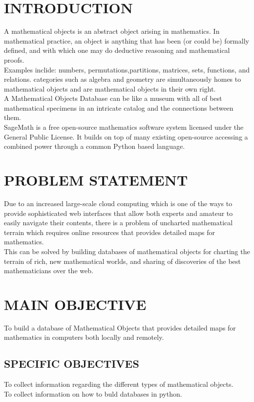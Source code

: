 \documentclass[11pt]{article} %
\begin{document}
\section{INTRODUCTION}
A mathematical objects is an abstract object arising in mathematics.
In mathematical practice, an object is anything that has been (or could be) formally defined, and with which one may do deductive reasoning and mathematical proofs.\\
Examples inclide: numbers, permutations,partitions, matrices, sets, functions, and relations.
categories such as algebra and geometry are simultaneously homes to mathematical objects and are mathematical objects in their own right.\\
A Mathematical Objects Database can be like a museum with all of best
mathematical specimens in an intricate catalog and the connections
between them.\\SageMath is a free open-source mathematics software
system licensed under the General Public License. It builds on top of
many existing open-source accessing a combined power through a common
Python based language.


\section{PROBLEM STATEMENT}

Due to an increased large-scale cloud computing which is one of the ways to provide sophisticated web interfaces that allow both experts and amateur to easily navigate their contents, there is a problem of uncharted mathematical terrain which requires online resources that provides detailed maps for mathematics.\\This can be solved by building databases of mathematical objects for charting the terrain of rich, new mathematical worlds, and sharing of discoveries of the best mathematicians over the web.\cite{ref:one}


\section{MAIN OBJECTIVE}

To build a database of Mathematical Objects that provides detailed maps for mathematics in computers both locally and remotely.

\subsection{SPECIFIC OBJECTIVES}
To collect information regarding the different types of mathematical objects.\\
To collect information on how to buld databases in python.\\
\end{document}
